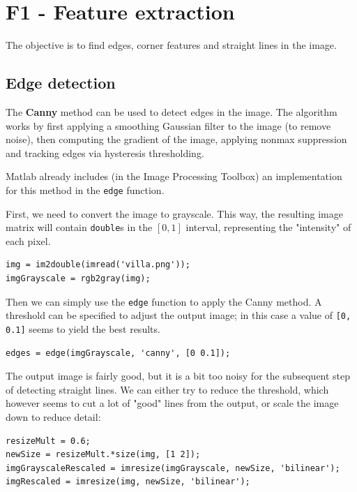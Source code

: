 \documentclass{Configuration_Files/PoliMi3i_thesis}
\begin{document}
\chapter{F1 - Feature extraction}
\label{ch:f1}%

The objective is to find edges, corner features and straight lines in the image.

\section{Edge detection}
\label{section:f1:edge_detection}
The \textbf{Canny} method can be used to detect edges in the image. The algorithm works by first applying a smoothing Gaussian filter to the image (to remove noise), then computing the gradient of the image, applying nonmax suppression and tracking edges via hysteresis thresholding.

Matlab already includes (in the Image Processing Toolbox) an implementation for this method in the \verb|edge| function.

First, we need to convert the image to grayscale. This way, the resulting image matrix will contain \verb|double|s in the $[0,1]$ interval, representing the "intensity" of each pixel.

\begin{verbatim}
img = im2double(imread('villa.png'));
imgGrayscale = rgb2gray(img);
\end{verbatim}

Then we can simply use the \verb|edge| function to apply the Canny method. A threshold can be specified to adjust the output image; in this case a value of \verb|[0, 0.1]| seems to yield the best results.
\begin{verbatim}
edges = edge(imgGrayscale, 'canny', [0 0.1]);
\end{verbatim}

The output image is fairly good, but it is a bit too noisy for the subsequent step of detecting straight lines. We can either try to reduce the threshold, which however seems to cut a lot of "good" lines from the output, or scale the image down to reduce detail:

\begin{verbatim}
resizeMult = 0.6;
newSize = resizeMult.*size(img, [1 2]);
imgGrayscaleRescaled = imresize(imgGrayscale, newSize, 'bilinear');
imgRescaled = imresize(img, newSize, 'bilinear');
\end{verbatim}
\end{document}
